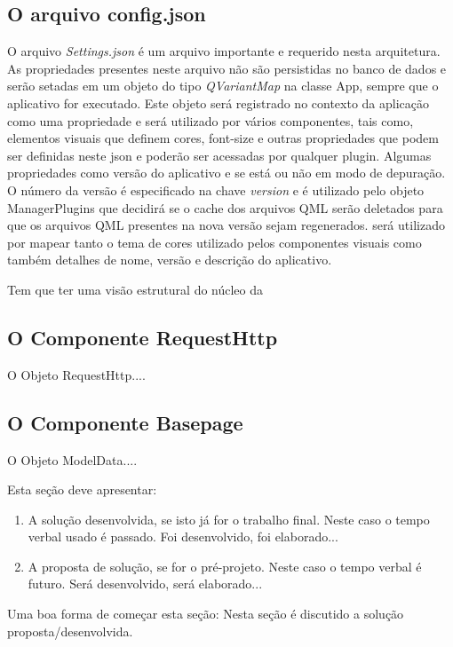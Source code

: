 \subsection{O arquivo config.json}\label{sec:solucao-desenvolvida}
O arquivo \textit{Settings.json} é um arquivo importante e requerido nesta arquitetura. As propriedades presentes neste arquivo não são persistidas no banco de dados e serão setadas em um objeto do tipo \textit{QVariantMap} na classe App, sempre que o aplicativo for executado. Este objeto será registrado no contexto da aplicação como uma propriedade e será utilizado por vários componentes, tais como, elementos visuais que definem cores, font-size e outras propriedades que podem ser definidas neste json e poderão ser acessadas por qualquer plugin. Algumas propriedades como versão do aplicativo e se está ou não em modo de depuração. O número da versão é especificado na chave \textit{version} e é utilizado pelo objeto ManagerPlugins que decidirá se o cache dos arquivos QML serão deletados para que os arquivos QML presentes na nova versão sejam regenerados. será utilizado por mapear tanto o tema de cores utilizado pelos componentes visuais como também detalhes de nome, versão e descrição do aplicativo.

Tem que ter uma visão estrutural do núcleo da 

\subsection{O Componente RequestHttp}\label{sec:solucao-desenvolvida}
O Objeto RequestHttp....

\subsection{O Componente Basepage}\label{sec:solucao-desenvolvida}
O Objeto ModelData....

Esta seção deve apresentar: 
\begin{enumerate}
\item A solução desenvolvida, se isto já for o trabalho final. Neste caso o tempo verbal usado é passado. Foi desenvolvido, foi elaborado...
\item A proposta de solução, se for o pré-projeto. Neste caso o tempo verbal é futuro. Será desenvolvido, será elaborado...
\end{enumerate}
Uma boa forma de começar esta seção:
Nesta seção é discutido a solução proposta/desenvolvida.
